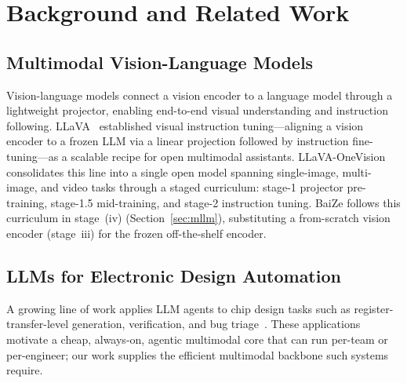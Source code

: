 ﻿\section{Background and Related Work}

\subsection{Multimodal Vision-Language Models}
Vision-language models connect a vision encoder to a language model through a lightweight projector, enabling end-to-end visual understanding and instruction following.
LLaVA~\cite{liu2023llava} established visual instruction tuning---aligning a vision encoder to a frozen LLM via a linear projection followed by instruction fine-tuning---as a scalable recipe for open multimodal assistants.
LLaVA-OneVision~\cite{li2024llavaonevision} consolidates this line into a single open model spanning single-image, multi-image, and video tasks through a staged curriculum: stage-1 projector pre-training, stage-1.5 mid-training, and stage-2 instruction tuning.
BaiZe follows this curriculum in stage~(iv) (Section~\ref{sec:mllm}), substituting a from-scratch vision encoder (stage~iii) for the frozen off-the-shelf encoder.

\subsection{LLMs for Electronic Design Automation}
A growing line of work applies LLM agents to chip design tasks such as register-transfer-level generation, verification, and bug triage~\cite{liu2023chipnemo,blocklove2024chip}.
These applications motivate a cheap, always-on, agentic multimodal core that can run per-team or per-engineer; our work supplies the efficient multimodal backbone such systems require.
